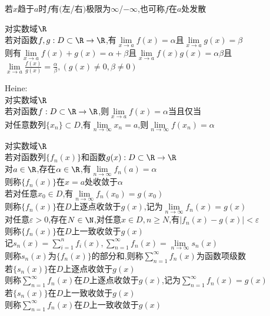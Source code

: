 \begin{zhu}
若$x$趋于$a$时$f$有$($左/右$)$极限为$\infty$/$-\infty$,也可称$f$在$a$处发散
\end{zhu}

\begin{dingli}
对实数域$\R$\\
若对函数$f,g:D\subset \R\to \R$,有$\lim\limits_{x\to a}f(x)=\alpha$且$\lim\limits_{x\to a}g(x)=\beta$\\
则有$\lim\limits_{x\to a}f(x)+g(x)=\alpha+\beta$且$\lim\limits_{x\to a}f(x)g(x)=\alpha\beta$且$\lim\limits_{x\to a}\frac{f(x)}{g(x)}=\frac{\alpha}{\beta},(g(x)\neq0,\beta\neq0)$
\end{dingli}

\begin{dingli}
Heine:\\
对实数域$\R$\\
若对函数$f:D\subset \R\to \R$,则$\lim\limits_{x\to a}f(x)=\alpha$当且仅当\\
对任意数列$\{x_n\}\subset D$,有$\lim\limits_{n\to\infty}x_n=a$,则$\lim\limits_{n\to \infty}f(x_n)=\alpha$
\end{dingli}

\begin{dingyi}
对实数域$\R$\\
若对函数列$\{f_n(x)\}$和函数$g(x):D\subset \R\to \R$\\
对$a\in \R$,存在$\alpha\in \R$,有$\lim\limits_{n\to \infty}f_n(a)=\alpha$\\
则称$\{f_n(x)\}$在$x=a$处收敛于$\alpha$\\
若对任意$x_0\in D$,有$\lim\limits_{n\to\infty}f_n(x_0)=g(x_0)$\\
则称$\{f_n(x)\}$在$D$上逐点收敛于$g(x)$,记为$\lim\limits_{n\to\infty}f_n(x)=g(x)$\\
对任意$\varepsilon>0$,存在$N\in\N$,对任意$x\in D,n\geq N$,有$|f_n(x)-g(x)|<\varepsilon$\\
则称$\{f_n(x)\}$在$D$上一致收敛于$g(x)$\\
记$s_n(x)=\sum\limits_{i=1}^{n}f_i(x),\sum\limits_{n=1}^{\infty}f_n(x)=\lim\limits_{n\to\infty}s_n(x)$\\
则称$s_n(x)$为$\{f_n(x)\}$的部分和,则称$\sum\limits_{n=1}^{\infty}f_n(x)$为函数项级数\\
若$\{s_n(x)\}$在$D$上逐点收敛于$g(x)$\\
则称$\sum\limits_{n=1}^{\infty}f_n(x)$在$D$上逐点收敛于$g(x)$,记为$\sum\limits_{n=1}^{\infty}f_n(x)=g(x)$\\
若$\{s_n(x)\}$在$D$上一致收敛于$g(x)$\\
则称$\sum\limits_{n=1}^{\infty}f_n(x)$在$D$上一致收敛于$g(x)$
\end{dingyi}


